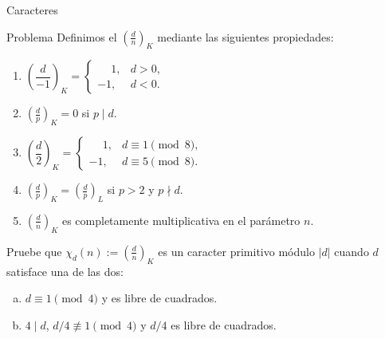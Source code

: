 \documentclass[handout, 10pt]{beamer}
\begin{document}
\begin{frame}{Caracteres}
	\begin{block}{Problema}
		Definimos el  $\left( \frac{d}{n} \right)_K$ mediante las siguientes propiedades:
		\begin{enumerate}
			\item $\left( \dfrac{d}{-1} \right)_K =
				\begin{cases}
					\phantom{-}1, & d > 0, \\
					-1, & d < 0.
				\end{cases}$
			\item $\left( \frac{d}{p} \right)_K = 0$ si $p \mid d$.
			\item\label{ax:kron2}
				$\left( \dfrac{d}{2} \right)_K =
				\begin{cases}
					\phantom{-}1, & d \equiv 1 \pmod 8, \\
					-1, & d \equiv 5 \pmod 8.
				\end{cases}$
			\item\label{ax:kron_leg}
				$\left( \frac{d}{p} \right)_K = \left( \frac{d}{p} \right)_L$ si $p > 2$ y $p \nmid d$.
			\item\label{ax:kron_mult}
				$\left( \frac{d}{n} \right)_K$ es completamente multiplicativa en el parámetro $n$.
		\end{enumerate}
		\pause
		Pruebe que $\chi_d(n) := \left( \frac{d}{n} \right)_K$ es un caracter primitivo módulo $|d|$ cuando $d$ satisface una de las
		dos:
		\begin{enumerate}[(a)]
			\item $d \equiv 1 \pmod 4$ y es libre de cuadrados.
			\item $4 \mid d$, $d/4 \not\equiv 1 \pmod 4$ y $d/4$ es libre de cuadrados.
		\end{enumerate}
	\end{block}
\end{frame}
\end{document}
